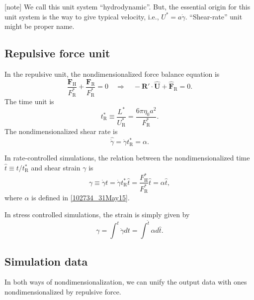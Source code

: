 \documentclass[fontsize=11pt]{scrartcl}
\begin{document}
[note]
We call this unit system ``hydrodynamic''.
But, the essential origin for this unit system
is the way to give typical velocity,
i.e., $U^{\ast} = a \dot{\gamma}$.
%
``Shear-rate'' unit might be proper name.


\subsection*{Repulsive force unit}

In the repulsive unit,
the nondimensionalized
force balance equation is
\begin{equation}
 \frac{\bm{F}_{\mathrm{H}}}{F^{\ast}_{\mathrm{R}}}
  +
  \frac{\bm{F}_{\mathrm{R}}}{F^{\ast}_{\mathrm{R}}}  = 0
      \quad
  \Longrightarrow
    \quad
    - \bm{R}' \cdot \hat{\bm{U}} +
    \hat{\bm{F}}_{\mathrm{R}} = 0.
\end{equation}
The time unit is
\begin{equation}
 t_{\mathrm{R}}^{\ast}
  \equiv \frac{L^{\ast}}{U_{\mathrm{R}}^{\ast}}
  = \frac{6 \pi \eta_0 a^2}{F_{\mathrm{R}}^{\ast}}.
\end{equation}
%
The nondimensionalized shear rate is
\begin{equation}
 \hat{\dot{\gamma}} =
  \dot{\gamma} t_{\mathrm{R}}^{\ast}
  = \alpha.
\end{equation}



In rate-controlled simulations,
the relation between
the nondimensionalized time
$\hat{t} \equiv t /t_{\mathrm{R}}^{\ast}$
and shear strain $\gamma$ is
\begin{equation}
 \gamma
  \equiv \dot{\gamma} t 
  = \dot{\gamma} t_{\mathrm{R}}^{\ast} \hat{t} 
   = 
\frac{F_{\mathrm{H}}^{\ast}}{F_{\mathrm{R}}^{\ast}}
\hat{t} = \alpha \hat{t},
\end{equation}
where $\alpha$ is defined in \eqref{102734_31May15}.

In stress controlled simulations,
the strain is simply given by
\begin{equation}
 \gamma
 = \int^{t} \dot{\gamma} dt
 = \int^{\hat{t}} \alpha d\hat{t}.
\end{equation}

\subsection*{Simulation data}

In both ways of nondimensionalization,
we can unify the output data with ones nondimensionalized by repulsive force.
\end{document}
